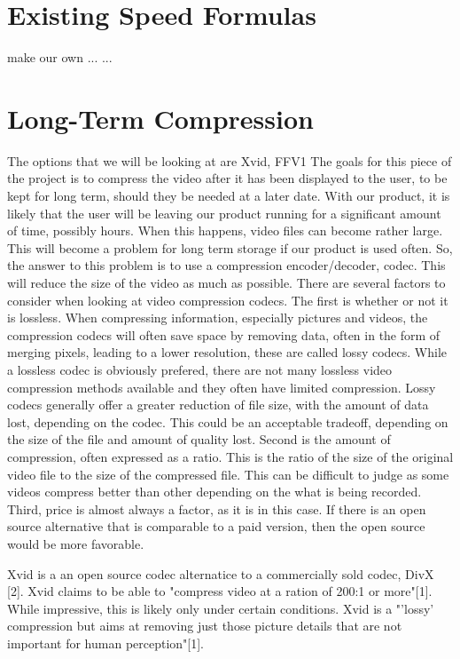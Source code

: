 \documentclass[letterpaper,10pt,onecolumn,draftclsnofoot]{IEEEtran}
\begin{document}
\section{Existing Speed Formulas} %

make our own
...
...

\section{Long-Term Compression} %

The options that we will be looking at are Xvid, FFV1 
The goals for this piece of the project is to compress the video after it has been displayed to the user, to be kept for long term, should they be needed at a later date.
With our product, it is likely that the user will be leaving our product running for a significant amount of time, possibly hours.
When this happens, video files can become rather large.
This will become a problem for long term storage if our product is used often.
So, the answer to this problem is to use a compression encoder/decoder, codec.
This will reduce the size of the video as much as possible.
There are several factors to consider when looking at video compression codecs.
The first is whether or not it is lossless.
When compressing information, especially pictures and videos, the compression codecs will often save space by removing data, often in the form of merging pixels, leading to a lower resolution, these are called lossy codecs.
While a lossless codec is obviously prefered, there are not many lossless video compression methods available and they often have limited compression.
Lossy codecs generally offer a greater reduction of file size, with the amount of data lost, depending on the codec.
This could be an acceptable tradeoff, depending on the size of the file and amount of quality lost.
Second is the amount of compression, often expressed as a ratio.
This is the ratio of the size of the original video file to the size of the compressed file.
This can be difficult to judge as some videos compress better than other depending on the what is being recorded.
Third, price is almost always a factor, as it is in this case.
If there is an open source alternative that is comparable to a paid version, then the open source would be more favorable.

Xvid is a an open source codec alternatice to a commercially sold codec, DivX [2].
Xvid claims to be able to "compress video at a ration of 200:1 or more"[1].
While impressive, this is likely only under certain conditions.
Xvid is a "'lossy' compression but aims at removing just those picture details that are not important for human perception"[1].
\end{document}
